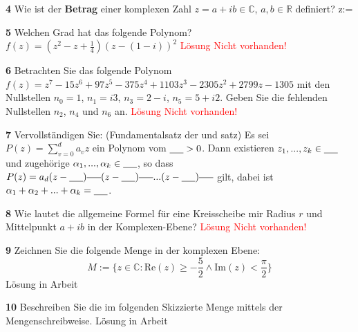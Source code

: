 \documentclass[11pt]{article}
\begin{document}
    \textbf{4} Wie ist der \textbf{Betrag} einer komplexen Zahl \( z = a + ib \in \mathbb{C} \), \( a,b \in \mathbb{R} \) definiert?\newline
    \rvert z\rvert := \newline

    \textbf{5} Welchen Grad hat das folgende Polynom? \(f(z) = (z^2 - z + \frac{1}{4})(z - (1 - i))^2\)\newline
    \textcolor{red}{Lösung Nicht vorhanden!}\newline

    \textbf{6} Betrachten Sie das folgende Polynom \(f(z) = z^7 - 15z^6 + 97z^5 - 375z^4 + 1103z^3 - 2305z^2 + 2799z - 1305\) mit den Nullstellen \(n_0 = 1\), \(n_1 = i3\), \(n_3 = 2 - i\), \(n_5 = 5 + i2\). Geben Sie die fehlenden Nullstellen \(n_2\), \(n_4\) und \(n_6\) an.\newline
    \textcolor{red}{Lösung Nicht vorhanden!}\newline

    \textbf{7} Vervollständigen Sie:
    (Fundamentalsatz der \underline{\hspace{2cm}} und \underline{\hspace{2cm}} satz) Es sei
    \( P(z) = \sum_{v=0}^{d} a_v z \)
    ein Polynom vom \( \underline{\hspace{0.5cm}} > 0 \). Dann existieren \( z_1, ..., z_k \in \underline{\hspace{0.5cm}} \) und zugehörige \( \alpha_1, ..., \alpha_k \in \underline{\hspace{0.5cm}} \), so dass
    \( P(z) = a_d (z-\underline{\hspace{0.5cm}})^{\underline{\hspace{0.5cm}}} (z-\underline{\hspace{0.5cm}})^{\underline{\hspace{0.5cm}}} ... (z-\underline{\hspace{0.5cm}})^{\underline{\hspace{0.5cm}}} \)
    gilt, dabei ist \( \alpha_1 + \alpha_2 + ... + \alpha_k = \underline{\hspace{0.5cm}} \).\newline

    \textbf{8} Wie lautet die allgemeine Formel für eine Kreisscheibe mir Radius $r$ und Mittelpunkt $a + ib$ in der Komplexen-Ebene?\newline
    \textcolor{red}{Lösung Nicht vorhanden!}\newline

    \textbf{9} Zeichnen Sie die folgende Menge in der komplexen Ebene:
    \[ M := \{ z \in \mathbb{C} : \text{Re}(z) \geq -\frac{5}{2} \land \text{Im}(z) < \frac{\pi}{2} \} \]\newline
    Lösung in Arbeit\newline

    \textbf{10} Beschreiben Sie die im folgenden Skizzierte Menge mittels der Mengenschreibweise.\newline
    Lösung in Arbeit\newline
\end{document}
